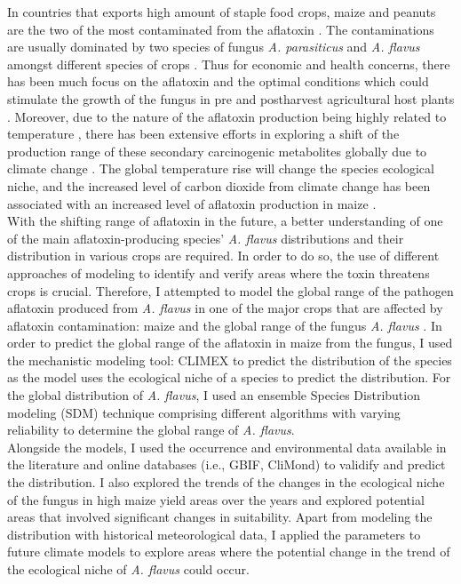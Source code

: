 In countries that exports high amount of staple food crops, maize and peanuts are the two of the most contaminated from the aflatoxin \citep{scussel2006study}. The contaminations are usually dominated by two species of fungus \textit{A. parasiticus} and \textit{A. flavus} amongst different species of crops \citep{kumar2017aflatoxins}.  Thus for economic and health concerns, there has been much focus on the aflatoxin and the optimal conditions which could stimulate the growth of the fungus in pre and postharvest agricultural host plants \citep{chauhan2015improved} \citep{gizachew2019aflatoxin}  \citep{liu2021physico}. Moreover, due to the nature of the aflatoxin production being highly related to temperature \citep{arrus2005aflatoxin}, there has been extensive efforts \citep{haerani2020climate} \citep{valencia2020environment} in exploring a shift of the production range of these secondary carcinogenic metabolites globally due to climate change \citep{haerani2020climate}. The global temperature rise will change the species ecological niche, and the increased level of carbon dioxide from climate change has been associated with an increased level of aflatoxin production in maize \citep{gilbert2017carbon}. 
\vspace{\baselineskip} \\
With the shifting range of aflatoxin in the future, a better understanding of one of the main aflatoxin-producing species' \textit{A. flavus} distributions and their distribution in various crops are required. In order to do so, the use of different approaches of modeling to identify and verify areas where the toxin threatens crops is crucial. Therefore, I attempted to model the global range of the pathogen aflatoxin produced from \textit{A. flavus} in one of the major crops that are affected by aflatoxin contamination: maize and the global range of the fungus \textit{A. flavus }. In order to predict the global range of the aflatoxin in maize from the fungus, I used the mechanistic modeling tool: CLIMEX to predict the distribution of the species as the model uses the ecological niche of a species to predict the distribution. For the global distribution of \textit{A. flavus}, I used an ensemble Species Distribution modeling (SDM) technique comprising different algorithms with varying reliability \citep{valavi2022predictive} to determine the global range of \textit{A. flavus}. 
\vspace{\baselineskip} \\ 
Alongside the models, I used the occurrence and environmental data available in the literature and online databases (i.e., GBIF, CliMond) to validify and predict the distribution. I also explored the trends of the changes in the ecological niche of the fungus in high maize yield areas over the years and explored potential areas that involved significant changes in suitability. Apart from modeling the distribution with historical meteorological data, I applied the parameters to future climate models to explore areas where the potential change in the trend of the ecological niche of \textit{A. flavus} could occur.